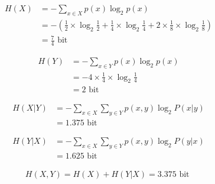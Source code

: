 \documentclass{ctexart}
\begin{document}
\begin{align*}
    H(X) &= -\sum_{x \in X}p(x) \log_2 p(x) \\
        &= - (\frac{1}{2} \times \log_2 \frac{1}{2} + \frac{1}{4} \times \log_2 \frac{1}{4} + 2 \times \frac{1}{8} \times \log_2 \frac{1}{8} ) \\
        &= \frac{7}{4} \text{ bit }
\end{align*}

\begin{align*}
    H(Y) &=  -\sum_{x \in Y}p(x) \log_2 p(x) \\
         &= - 4 \times \frac{1}{4} \times \log_2 \frac{1}{4} \\
         &= 2 \text{ bit }
\end{align*}

\begin{align*}
    H(X|Y) &= -\sum_{x \in X}\sum_{y \in Y}p(x,y)\log_2P(x|y) \\
           &= 1.375\text{ bit }
\end{align*}

\begin{align*}
    H(Y|X) &= -\sum_{x \in X}\sum_{y \in Y}p(x,y)\log_2P(y|x) \\
           &= 1.625\text{ bit }
\end{align*}

\begin{align*}
    H(X, Y) = H(X) + H(Y|X) = 3.375\text{ bit }
\end{align*}
\end{document}
